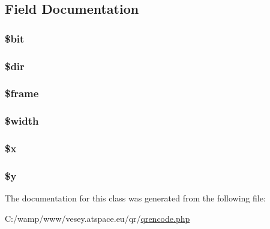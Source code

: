 \subsection{Field Documentation}
\hypertarget{class_frame_filler_a43ea1718834af94a8cbebd17611666ae}{
\subsubsection[{\$bit}]{\setlength{\rightskip}{0pt plus 5cm}\$bit}}\label{class_frame_filler_a43ea1718834af94a8cbebd17611666ae}
\hypertarget{class_frame_filler_a1659f0a629d408e0f849dbe4ee061e62}{
\subsubsection[{\$dir}]{\setlength{\rightskip}{0pt plus 5cm}\$dir}}\label{class_frame_filler_a1659f0a629d408e0f849dbe4ee061e62}
\hypertarget{class_frame_filler_a2c5e909bcaf7c8dfc4672361f47867ee}{
\subsubsection[{\$frame}]{\setlength{\rightskip}{0pt plus 5cm}\$frame}}\label{class_frame_filler_a2c5e909bcaf7c8dfc4672361f47867ee}
\hypertarget{class_frame_filler_a5795120b4b324bc4ca83f1e6fdce7d57}{
\subsubsection[{\$width}]{\setlength{\rightskip}{0pt plus 5cm}\$width}}\label{class_frame_filler_a5795120b4b324bc4ca83f1e6fdce7d57}
\hypertarget{class_frame_filler_af3a16c5f0dd7a74cf9acf6a49fff73a7}{
\subsubsection[{\$x}]{\setlength{\rightskip}{0pt plus 5cm}\$x}}\label{class_frame_filler_af3a16c5f0dd7a74cf9acf6a49fff73a7}
\hypertarget{class_frame_filler_a77b973d137fb33212e018b042df6e3e7}{
\subsubsection[{\$y}]{\setlength{\rightskip}{0pt plus 5cm}\$y}}\label{class_frame_filler_a77b973d137fb33212e018b042df6e3e7}


The documentation for this class was generated from the following file\-:\begin{DoxyCompactItemize}
\item 
C\-:/wamp/www/vesey.\-atspace.\-eu/qr/\hyperlink{qrencode_8php}{qrencode.\-php}\end{DoxyCompactItemize}

